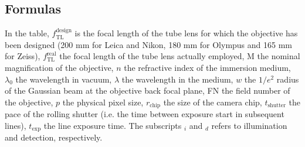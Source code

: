 \documentclass[12pt]{spieman}  %
\begin{document}
\begin{spacing}{2}
\subsection{Formulas}

In the table, $f_{\text{TL}}^{\text{design}}$ is the focal length of the tube lens for which the objective has been designed (200 mm for Leica and Nikon, 180 mm for Olympus and 165 mm for Zeiss), $f_{\text{TL}}^{\text{real}}$ the focal length of the tube lens actually employed, $\text{M}$ the nominal magnification of the objective, $n$ the refractive index of the immersion medium, $\lambda_0$ the wavelength in vacuum, $\lambda$ the wavelength in the medium, $w$ the $1/e^2$ radius of the Gaussian beam at the objective back focal plane, FN the field number of the objective, $p$ the physical pixel size, $r_{\text{chip}}$ the size of the camera chip, $t_{\text{shutter}}$ the pace of the rolling shutter (i.e. the time between exposure start in subsequent lines), $ t_{\text{exp}}$ the line exposure time. The subscripts $_i$ and $_d$ refers to illumination and detection, respectively.


\end{spacing}
\end{document}

